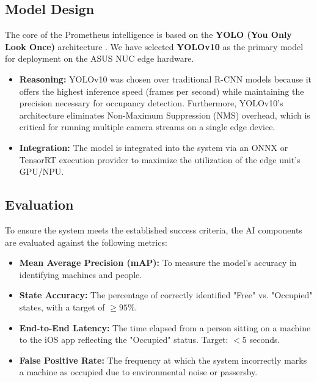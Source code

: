\subsection{Model Design}
The core of the Prometheus intelligence is based on the \textbf{YOLO (You Only Look Once)} architecture \cite{ultralytics:yolov8}. We have selected \textbf{YOLOv10} \cite{wang2024yolov10}  as the primary model for deployment on the ASUS NUC edge hardware. 
\begin{itemize}
    \item \textbf{Reasoning:} YOLOv10 was chosen over traditional R-CNN models because it offers the highest inference speed (frames per second) while maintaining the precision necessary for occupancy detection. Furthermore, YOLOv10's architecture eliminates Non-Maximum Suppression (NMS) overhead, which is critical for running multiple camera streams on a single edge device.
    \item \textbf{Integration:} The model is integrated into the system via an ONNX or TensorRT execution provider to maximize the utilization of the edge unit's GPU/NPU.
\end{itemize}

\subsection{Evaluation}
To ensure the system meets the established success criteria, the AI components are evaluated against the following metrics:
\begin{itemize}
    \item \textbf{Mean Average Precision (mAP):} To measure the model's accuracy in identifying machines and people.
    \item \textbf{State Accuracy:} The percentage of correctly identified "Free" vs. "Occupied" states, with a target of $\geq 95\%$.
    \item \textbf{End-to-End Latency:} The time elapsed from a person sitting on a machine to the iOS app reflecting the "Occupied" status. Target: $< 5$ seconds.
    \item \textbf{False Positive Rate:} The frequency at which the system incorrectly marks a machine as occupied due to environmental noise or passersby.
\end{itemize}